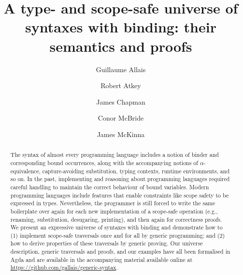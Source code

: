 \documentclass{jfp}
\begin{document}


\totalpg{\pageref{lastpage01}}

\title{A type- and scope-safe universe of syntaxes with binding: their semantics and proofs}

\begin{authgrp}
  \author{Guillaume Allais}\\
  \author{Robert Atkey}
  \author{James Chapman}
  \author{Conor McBride}
  \author{James McKinna}
\end{authgrp}


\begin{abstract}
The syntax of almost every programming language includes a notion of binder
and corresponding bound occurrences, along with the accompanying
notions of $\alpha$-equivalence, capture-avoiding substitution, typing
contexts, runtime environments, and so on. In the past, implementing
and reasoning about programming languages required careful handling to
maintain the correct behaviour of bound variables. Modern programming
languages include features that enable constraints like scope safety
to be expressed in types. Nevertheless, the programmer is still forced
to write the same boilerplate over again for each new implementation
of a scope-safe operation (e.g., renaming, substitution, desugaring,
printing), and then again for correctness proofs.
We present an expressive universe of syntaxes with binding and
demonstrate how to (1) implement scope-safe traversals once and for
all by generic programming; and (2) how to derive properties of these
traversals by generic proving. Our universe description, generic
traversals and proofs, and our examples have all been formalised in
Agda and are available in the accompanying material available online
at \url{https://github.com/gallais/generic-syntax}.
\end{abstract}
\end{document}

